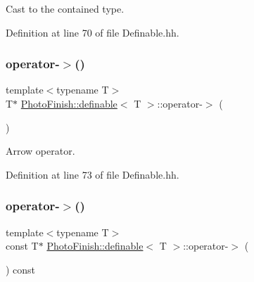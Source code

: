Cast to the contained type. 



Definition at line 70 of file Definable.\+hh.

\mbox{\label{class_photo_finish_1_1definable_a0e82c3242b2da5bb3ad65cf2149b6f30}} 
\subsubsection{\texorpdfstring{operator-\/$>$()}{operator->()}\hspace{0.1cm}{\footnotesize\ttfamily [1/2]}}
{\footnotesize\ttfamily template$<$typename T$>$ \\
T$\ast$ \hyperlink{class_photo_finish_1_1definable}{Photo\+Finish\+::definable}$<$ T $>$\+::operator-\/$>$ (\begin{DoxyParamCaption}{ }\end{DoxyParamCaption})\hspace{0.3cm}{\ttfamily [inline]}}



Arrow operator. 



Definition at line 73 of file Definable.\+hh.

\mbox{\label{class_photo_finish_1_1definable_abeb8cd4e0d95d064ba43c61ed092e77a}} 
\subsubsection{\texorpdfstring{operator-\/$>$()}{operator->()}\hspace{0.1cm}{\footnotesize\ttfamily [2/2]}}
{\footnotesize\ttfamily template$<$typename T$>$ \\
const T$\ast$ \hyperlink{class_photo_finish_1_1definable}{Photo\+Finish\+::definable}$<$ T $>$\+::operator-\/$>$ (\begin{DoxyParamCaption}{ }\end{DoxyParamCaption}) const\hspace{0.3cm}{\ttfamily [inline]}}



